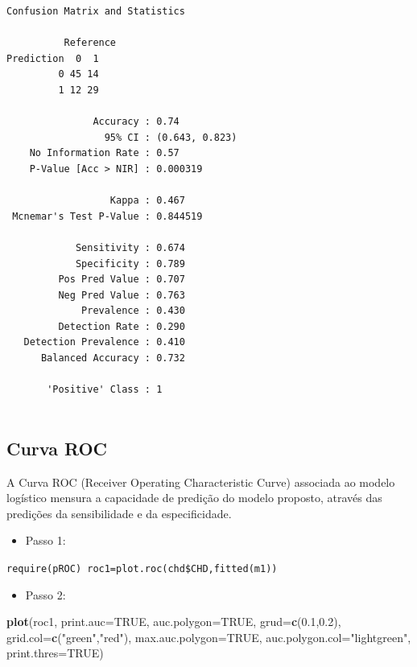\documentclass[12pt,brazil,oneside]{book}
\newenvironment{Shaded}{\begin{snugshade}}{\end{snugshade}}
\newcommand{\DataTypeTok}[1]{\textcolor[rgb]{0.13,0.29,0.53}{#1}}
\newcommand{\FloatTok}[1]{\textcolor[rgb]{0.00,0.00,0.81}{#1}}
\newcommand{\KeywordTok}[1]{\textcolor[rgb]{0.13,0.29,0.53}{\textbf{#1}}}
\newcommand{\NormalTok}[1]{#1}
\newcommand{\OtherTok}[1]{\textcolor[rgb]{0.56,0.35,0.01}{#1}}
\newcommand{\StringTok}[1]{\textcolor[rgb]{0.31,0.60,0.02}{#1}}
\providecommand{\tightlist}{%
  \setlength{\itemsep}{0pt}\setlength{\parskip}{0pt}}
\begin{document}
\begin{verbatim}
Confusion Matrix and Statistics

          Reference
Prediction  0  1
         0 45 14
         1 12 29
                                        
               Accuracy : 0.74          
                 95% CI : (0.643, 0.823)
    No Information Rate : 0.57          
    P-Value [Acc > NIR] : 0.000319      
                                        
                  Kappa : 0.467         
 Mcnemar's Test P-Value : 0.844519      
                                        
            Sensitivity : 0.674         
            Specificity : 0.789         
         Pos Pred Value : 0.707         
         Neg Pred Value : 0.763         
             Prevalence : 0.430         
         Detection Rate : 0.290         
   Detection Prevalence : 0.410         
      Balanced Accuracy : 0.732         
                                        
       'Positive' Class : 1             
                                        
\end{verbatim}

\hypertarget{curva-roc}{%
\subsection{Curva ROC}\label{curva-roc}}

A Curva ROC (Receiver Operating Characteristic Curve) associada ao
modelo logístico mensura a capacidade de predição do modelo proposto,
através das predições da sensibilidade e da especificidade.

\begin{itemize}
\tightlist
\item
  Passo 1:
\end{itemize}

\texttt{require(pROC)\ roc1=plot.roc(chd\$CHD,fitted(m1))}

\begin{itemize}
\tightlist
\item
  Passo 2:
\end{itemize}

\begin{Shaded}
\begin{Highlighting}[]
\KeywordTok{plot}\NormalTok{(roc1,}
     \DataTypeTok{print.auc=}\OtherTok{TRUE}\NormalTok{, }
     \DataTypeTok{auc.polygon=}\OtherTok{TRUE}\NormalTok{, }
     \DataTypeTok{grud=}\KeywordTok{c}\NormalTok{(}\FloatTok{0.1}\NormalTok{,}\FloatTok{0.2}\NormalTok{),}
     \DataTypeTok{grid.col=}\KeywordTok{c}\NormalTok{(}\StringTok{"green"}\NormalTok{,}\StringTok{"red"}\NormalTok{), }
     \DataTypeTok{max.auc.polygon=}\OtherTok{TRUE}\NormalTok{, }
     \DataTypeTok{auc.polygon.col=}\StringTok{"lightgreen"}\NormalTok{, }
     \DataTypeTok{print.thres=}\OtherTok{TRUE}\NormalTok{)}
\end{Highlighting}
\end{Shaded}
\end{document}
